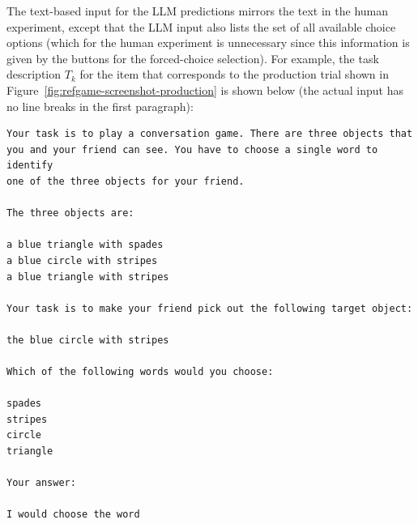 \documentclass[fleqn]{article}
\begin{document}
The text-based input for the LLM predictions mirrors the text in the human experiment, except that the LLM input also lists the set of all available choice options (which for the human experiment is unnecessary since this information is given by the buttons for the forced-choice selection).
For example, the task description $T_{k}$ for the item that corresponds to the production trial shown in Figure~\ref{fig:refgame-screenshot-production} is shown below (the actual input has no line breaks in the first paragraph):

\begin{verbatim}
Your task is to play a conversation game. There are three objects that
you and your friend can see. You have to choose a single word to identify
one of the three objects for your friend.

The three objects are:

a blue triangle with spades
a blue circle with stripes
a blue triangle with stripes

Your task is to make your friend pick out the following target object:

the blue circle with stripes

Which of the following words would you choose:

spades
stripes
circle
triangle

Your answer:

I would choose the word
\end{verbatim}



\end{document}
